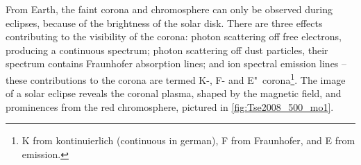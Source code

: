 From Earth, the faint corona and chromosphere can only be observed during eclipses, because of the brightness of the solar disk. There are three effects contributing to the visibility of the corona: photon scattering off free electrons, producing a continuous spectrum; photon scattering off dust particles, their spectrum contains Fraunhofer absorption lines; and ion spectral emission lines -- these contributions to the corona are termed K-, F- and E"~corona\footnote{K from kontinuierlich (continuous in german), F from Fraunhofer, and E from emission.}.
The image of a solar eclipse reveals the coronal plasma, shaped by the magnetic field, and prominences from the red chromosphere, pictured in \autoref{fig:Tse2008_500_mo1}.
\begin{figure}[htb]
\end{figure}

